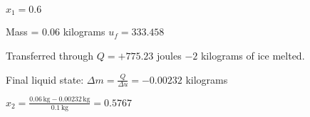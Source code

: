 \( x_1 = 0.6 \)  

Mass = 0.06 kilograms  
\( u_f = 333.458 \)  

Transferred through \( Q = +775.23 \) joules  
\(-2 \) kilograms of ice melted.  

Final liquid state:  
\( \Delta m = \frac{Q}{\Delta u} = -0.00232 \) kilograms  

\( x_2 = \frac{0.06 \, \text{kg} - 0.00232 \, \text{kg}}{0.1 \, \text{kg}} = 0.5767 \)